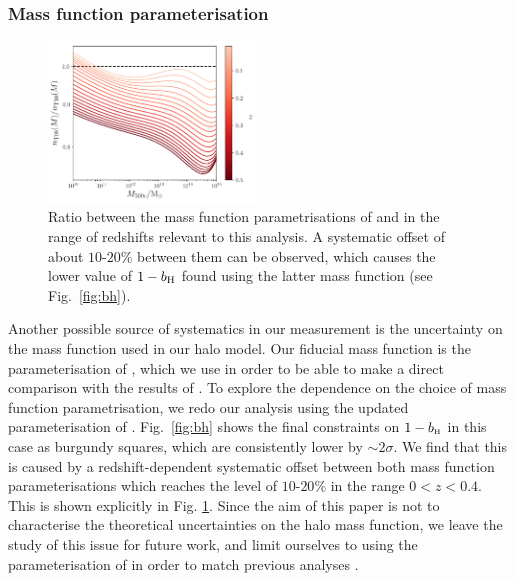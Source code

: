 \documentclass[useAMS,usenatbib]{mn2e}
\def\bH{b_{\scriptscriptstyle\rm H}}
\begin{document}
      \subsubsection{Mass function parameterisation}\label{sssec:results.syst.mf}
      \begin{figure}
        \centering
        \includegraphics[width=0.49\textwidth]{mf_ratio.pdf}
        \caption{Ratio between the mass function parametrisations of \citet{2008ApJ...688..709T} and \citet{2010ApJ...724..878T} in the range of redshifts relevant to this analysis. A systematic offset of about $10$-$20\%$ between them can be observed, which causes the lower value of $1-b_{\rm H}$ found using the latter mass function (see Fig.\!~\ref{fig:bh}). }
        \label{fig:mf_ratio}
      \end{figure}
      Another possible source of systematics in our measurement is the uncertainty on the mass function used in our halo model. Our fiducial mass function is the parameterisation of \cite{2008ApJ...688..709T}, which we use in order to be able to make a direct comparison with the results of \cite{2016A&A...594A..24P}. To explore the dependence on the choice of mass function parametrisation, we redo our analysis using the updated parameterisation of \cite{2010ApJ...724..878T}. Fig.\!~\ref{fig:bh} shows the final constraints on $1-\bH$ in this case as burgundy squares, which are consistently lower by $\sim 2\sigma$. We find that this is caused by a redshift-dependent systematic offset between both mass function parameterisations which reaches the level of $10$-$20\%$ in the range $0<z<0.4$. This is shown explicitly in Fig. \ref{fig:mf_ratio}. Since the aim of this paper is not to characterise the theoretical uncertainties on the halo mass function, we leave the study of this issue for future work, and limit ourselves to using the parameterisation of \cite{2008ApJ...688..709T} in order to match previous analyses \citep[e.g.][]{2016A&A...594A..24P,2018MNRAS.477.4957B,2018MNRAS.473.4318A,2019arXiv190407887Z,2019arXiv190707870M}.
\end{document}
